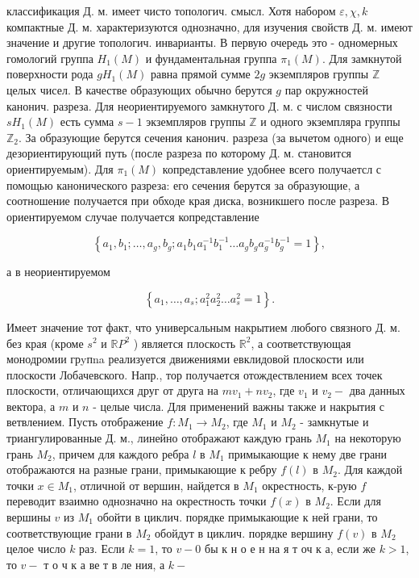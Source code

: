 \documentclass[10pt]{article}
\begin{document}
классификация Д. м. имеет чисто топологич. смысл. Хотя набором $\varepsilon, \chi, k$ компактные Д. м. характеризуются однозначно, для изучения свойств Д. м. имеют значение и другие топологич. инварианты. В первую очередь это - одномерных гомологий группа $H_{1}(M)$ и фундаментальная группа $\pi_{1}(M)$. Для замкнутой поверхности рода $g H_{1}(M)$ равна прямой сумме $2 g$ экземпляров группы $\mathbb{Z}$ целых чисел. В качестве образующих обычно берутся $g$ пар окружностей канонич. разреза. Для неориентируемого замкнутого Д. м. с числом связности $s H_{1}(M)$ есть сумма $s-1$ экземпляров группы $\mathbb{Z}$ и одного экземпляра группы $\mathbb{Z}_{2}$. За образующие берутся сечения канонич. разреза (за вычетом одного) и еще дезориентирующий путь (после разреза по которому Д. м. становится ориентируемым). Для $\pi_{1}(M)$ копредставление удобнее всего получаетсл с помощью канонического разреза: его сечения берутся за образующие, а соотношение получается при обходе края диска, возникшего после разреза. В ориентируемом случае получается копредставление



\[

\left\{a_{1}, b_{1} ; \ldots, a_{g}, b_{g} ; a_{1} b_{1} a_{1}^{-1} b_{1}^{-1} \ldots a_{g} b_{g} a_{g}^{-1} b_{g}^{-1}=1\right\},

\]



а в неориентируемом



\[

\left\{a_{1}, \ldots, a_{s} ; a_{1}^{2} a_{2}^{2} \ldots a_{s}^{2}=1\right\} .

\]



Имеет значение тот факт, что универсальным накрытием любого связного Д. м. без края (кроме $s^{2}$ и $\mathbb{R} P^{2}$ ) является плоскость $\mathbb{R}^{2}$, а соответствующая монодромии грyпna реализуется движениями евклидовой плоскости или плоскости Лобачевского. Напр., тор получается отождествлением всех точек плоскости, отличающихся друг от друга на $m v_{1}+n v_{2}$, где $v_{1}$ и $v_{2}-$ два данных вектора, а $m$ и $n$ - целые числа. Для применений важны также и накрытия с ветвлением. Пусть отображение $f: M_{1} \rightarrow M_{2}$, где $M_{1}$ и $M_{2}$ - замкнутые и триангулированные Д. м., линейно отображают каждую грань $M_{1}$ на некоторую грань $M_{2}$, причем для каждого ребра $l$ в $M_{1}$ примыкающие к нему две грани отображаются на разные грани, примыкающие к ребру $f(l)$ в $M_{2}$. Для каждой точки $x \in M_{1}$, отличной от вершин, найдется в $M_{1}$ окрестность, к-рую $f$ переводит взаимно однозначно на окрестность точки $f(x)$ в $M_{2}$. Если для вершины $v$ из $M_{1}$ обойти в циклич. порядке примыкающие к ней грани, то соответствующие грани в $M_{2}$ обойдут в циклич. порядке вершину $f(v)$ в $M_{2}$ целое число $k$ раз. Если $k=1$, то $v-0$ бы к н о е н на я т оч к а, если же $k>1$, то $v-$ т о ч к а ве т в ле ния, а $k-$
\end{document}
